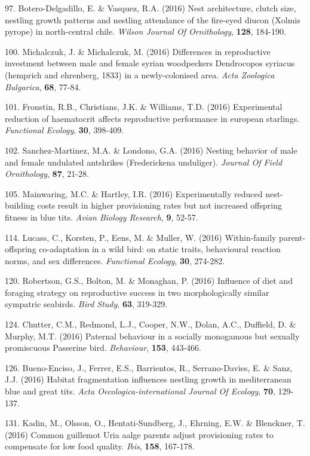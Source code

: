 97. Botero-Delgadillo, E. \&  Vasquez, R.A. (2016) Nest architecture, clutch size, nestling growth patterns and nestling attendance of the fire-eyed diucon (Xolmis pyrope) in north-central chile. \textit{Wilson Journal Of Ornithology},  \textbf{128}, 184-190.

100. Michalczuk, J. \&  Michalczuk, M. (2016) Differences in reproductive investment between male and female syrian woodpeckers Dendrocopos syriacus (hemprich and ehrenberg, 1833) in a newly-colonised area. \textit{Acta Zoologica Bulgarica},  \textbf{68}, 77-84.

101. Fronstin, R.B., Christians, J.K. \&  Williams, T.D. (2016) Experimental reduction of haematocrit affects reproductive performance in european starlings. \textit{Functional Ecology},  \textbf{30}, 398-409.

102. Sanchez-Martinez, M.A. \&  Londono, G.A. (2016) Nesting behavior of male and female undulated antshrikes (Frederickena unduliger). \textit{Journal Of Field Ornithology},  \textbf{87}, 21-28.

105. Mainwaring, M.C. \&  Hartley, I.R. (2016) Experimentally reduced nest-building costs result in higher provisioning rates but not increased offspring fitness in blue tits. \textit{Avian Biology Research},  \textbf{9}, 52-57.

114. Lucass, C., Korsten, P., Eens, M. \&  Muller, W. (2016) Within-family parent-offspring co-adaptation in a wild bird: on static traits, behavioural reaction norms, and sex differences. \textit{Functional Ecology},  \textbf{30}, 274-282.

120. Robertson, G.S., Bolton, M. \&  Monaghan, P. (2016) Influence of diet and foraging strategy on reproductive success in two morphologically similar sympatric seabirds. \textit{Bird Study},  \textbf{63}, 319-329.

124. Chutter, C.M., Redmond, L.J., Cooper, N.W., Dolan, A.C., Duffield, D. \&  Murphy, M.T. (2016) Paternal behaviour in a socially monogamous but sexually promiscuous Passerine bird. \textit{Behaviour},  \textbf{153}, 443-466.

126. Bueno-Enciso, J., Ferrer, E.S., Barrientos, R., Serrano-Davies, E. \&  Sanz, J.J. (2016) Habitat fragmentation influences nestling growth in mediterranean blue and great tits. \textit{Acta Oecologica-international Journal Of Ecology},  \textbf{70}, 129-137.

131. Kadin, M., Olsson, O., Hentati-Sundberg, J., Ehrning, E.W. \&  Blenckner, T. (2016) Common guillemot Uria aalge parents adjust provisioning rates to compensate for low food quality. \textit{Ibis},  \textbf{158}, 167-178.

